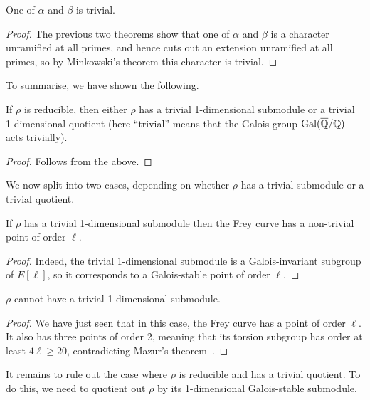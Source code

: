 \begin{corollary}\label{Frey_characters_trivial} One of $\alpha$ and $\beta$ is trivial.
\end{corollary}
\begin{proof}
The previous two theorems show that one of $\alpha$ and $\beta$ is a character unramified at all
primes, and hence cuts out an extension unramified at all primes, so by Minkowski's theorem this character
is trivial. 
\end{proof}

To summarise, we have shown the following.
\begin{theorem}\label{Frey_curve_reducible_structure} If $\rho$ is reducible, then either $\rho$
  has a trivial 1-dimensional submodule or a trivial 1-dimensional quotient (here ``trivial'' means
  that the Galois group $\operatorname{Gal}(\overline{\mathbb{Q}}/\mathbb{Q})$ acts trivially).
\end{theorem}
\begin{proof} Follows from the above.
\end{proof}

We now split into two cases, depending on whether $\rho$ has a trivial submodule or a trivial quotient.

\begin{lemma}\label{Frey_curve_trivial_submodule} If $\rho$ has a trivial 1-dimensional submodule then the
  Frey curve has a non-trivial point of order $\ell$.
\end{lemma}
\begin{proof} Indeed, the trivial 1-dimensional submodule is a Galois-invariant subgroup of $E[\ell]$, so
  it corresponds to a Galois-stable point of order $\ell$.
\end{proof}

\begin{corollary}\label{Frey_curve_no_trivial_submodule} $\rho$ cannot have a trivial 1-dimensional submodule.
\end{corollary}
\begin{proof}
  We have just seen that in this case, the Frey curve has a point of order $\ell$.
  It also has three points of order 2, meaning that its torsion subgroup has order at least
  $4\ell\geq 20$, contradicting Mazur's theorem~\cite{mazur}.
\end{proof}

It remains to rule out the case where $\rho$ is reducible and has a trivial quotient. To do this, we need
to quotient out $\rho$ by its 1-dimensional Galois-stable submodule.

